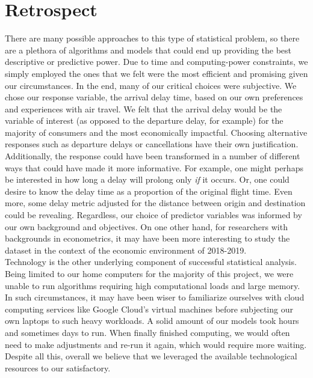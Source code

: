 \documentclass[12pt, a4paper, openany]{book}
\newcommand\tab[1][1cm]{\hspace*{#1}}
\begin{document}
	\section{Retrospect}
	\tab There are many possible approaches to this type of statistical problem, so there are a plethora of algorithms and models that could end up providing the best descriptive or predictive power. Due to time and computing-power constraints, we simply employed the ones that we felt were the most efficient and promising given our circumstances. In the end, many of our critical choices were subjective. We chose our response variable, the arrival delay time, based on our own preferences and experiences with air travel. We felt that the arrival delay would be the variable of interest (as opposed to the departure delay, for example) for the majority of consumers and the most economically impactful. Choosing alternative responses such as departure delays or cancellations have their own justification. Additionally, the response could have been transformed in a number of different ways that could have made it more informative. For example, one might perhaps be interested in how long a delay will prolong only \textit{if} it occurs. Or, one could desire to know the delay time as a proportion of the original flight time. Even more, some delay metric adjusted for the distance between origin and destination could be revealing. Regardless, our choice of predictor variables was informed by our own background and objectives. On one other hand, for researchers with backgrounds in econometrics, it may have been more interesting to study the dataset in the context of the economic environment of 2018-2019. \\
	\tab  Technology is the other underlying component of successful statistical analysis. Being limited to our home computers for the majority of this project, we were unable to run algorithms requiring high computational loads and large memory. In such circumstances, it may have been wiser to familiarize ourselves with cloud computing services like Google Cloud's virtual machines before subjecting our own laptops to such heavy workloads. A solid amount of our models took hours and sometimes days to run. When finally finished computing, we would often need to make adjustments and re-run it again, which would require more waiting. Despite all this, overall we believe that we leveraged the available technological resources to our satisfactory.
\end{document}
